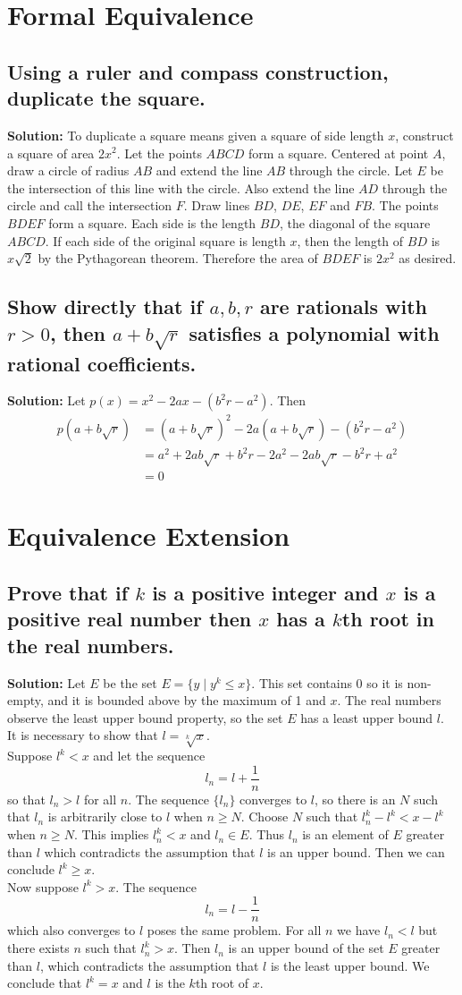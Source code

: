 \documentclass{article}
\newcommand{\exercise}[1]{\subsection{\normalfont #1}}
\newcommand{\solution}{\indent\indent \textbf{Solution: }}
\begin{document}
\newpage
\section{Formal Equivalence}
\exercise{Using a ruler and compass construction, duplicate the square.}
\solution
To duplicate a square means given a square of side length $x$, construct a square of area $2x^2$. Let the points $ABCD$ form a square. Centered at point $A$, draw a circle of radius $AB$ and extend the line $AB$ through the circle. Let $E$ be the intersection of this line with the circle. Also extend the line $AD$ through the circle and call the intersection $F$. Draw lines $BD$, $DE$, $EF$ and $FB$. The points $BDEF$ form a square. Each side is the length $BD$, the diagonal of the square $ABCD$. If each side of the original square is length $x$, then the length of $BD$ is $x\sqrt 2$ by the Pythagorean theorem. Therefore the area of $BDEF$ is $2x^2$ as desired.

\exercise{Show directly that if $a, b, r$ are rationals with $r > 0$, then $a + b\sqrt r$ satisfies a polynomial with rational coefficients.}
\solution
Let $p(x) = x^2 - 2ax - (b^2r -a^2)$. Then
\begin{align*}
p(a + b\sqrt r) &= (a + b\sqrt r)^2 - 2a(a + b\sqrt r) - (b^2r - a^2)  \\
&= a^2 + 2ab\sqrt r + b^2r - 2a^2 - 2ab\sqrt r - b^2r + a^2 \\
&= 0
\end{align*}

\newpage
\section{Equivalence Extension}
\exercise{Prove that if $k$ is a positive integer and $x$ is a positive real number then $x$ has a $k$th root in the real numbers.}
\solution
Let $E$ be the set $E = \{y \mid y^k \leq x\}$. This set contains 0 so it is non-empty, and it is bounded above by the maximum of 1 and $x$. The real numbers observe the least upper bound property, so the set $E$ has a least upper bound $l$. It is necessary to show that $l = \sqrt[k]x$. \\
\indent Suppose $l^k < x$ and let the sequence 
$$l_n = l + \frac{1}{n}$$
so that $l_n > l$ for all $n$. The sequence $\{l_n\}$ converges to $l$, so there is an $N$ such that $l_n$ is arbitrarily close to $l$ when $n\geq N$. Choose $N$ such that $l_n^k-l^k < x -l^k$ when $n\geq N$. This implies $l_n^k < x$ and $l_n \in E$. Thus $l_n$ is an element of $E$ greater than $l$ which contradicts the assumption that $l$ is an upper bound. Then we can conclude $l^k\geq x$. \\
\indent Now suppose $l^k > x$. The sequence
$$l_n = l - \frac{1}{n}$$
which also converges to $l$ poses the same problem. For all $n$ we have $l_n < l$ but there exists $n$ such that $l_n^k > x$. Then $l_n$ is an upper bound of the set $E$ greater than $l$, which contradicts the assumption that $l$ is the least upper bound. We conclude that $l^k = x$ and $l$ is the $k$th root of $x$.
\end{document}
